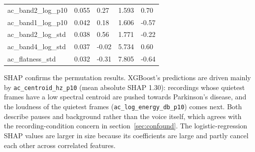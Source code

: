 \documentclass[11pt,a4paper]{article}
\begin{document}
\begin{center}
\begin{longtable}{>{\raggedright\arraybackslash}p{4.20cm}>{\raggedleft\arraybackslash}p{2.55cm}>{\raggedleft\arraybackslash}p{2.55cm}>{\raggedleft\arraybackslash}p{2.55cm}>{\raggedleft\arraybackslash}p{2.55cm}}
\hspace{0pt}ac\_\allowbreak{}band2\_\allowbreak{}log\_\allowbreak{}p10 & \hspace{0pt}0.055 & \hspace{0pt}0.27 & \hspace{0pt}1.593 & \hspace{0pt}0.70\\
\hspace{0pt}ac\_\allowbreak{}band1\_\allowbreak{}log\_\allowbreak{}p10 & \hspace{0pt}0.042 & \hspace{0pt}0.18 & \hspace{0pt}1.606 & \hspace{0pt}-0.57\\
\hspace{0pt}ac\_\allowbreak{}band2\_\allowbreak{}log\_\allowbreak{}std & \hspace{0pt}0.038 & \hspace{0pt}0.56 & \hspace{0pt}1.771 & \hspace{0pt}-0.22\\
\hspace{0pt}ac\_\allowbreak{}band4\_\allowbreak{}log\_\allowbreak{}std & \hspace{0pt}0.037 & \hspace{0pt}-0.02 & \hspace{0pt}5.734 & \hspace{0pt}0.60\\
\hspace{0pt}ac\_\allowbreak{}flatness\_\allowbreak{}std & \hspace{0pt}0.032 & \hspace{0pt}-0.31 & \hspace{0pt}7.805 & \hspace{0pt}-0.64\\
\end{longtable}\end{center}
\begin{tcolorbox}[colback=blue!3,colframe=blue!50!black,boxrule=0.5pt,arc=2pt,left=5pt,right=5pt,top=3pt,bottom=3pt,title={\small\bfseries What this tells us}]\small SHAP confirms the permutation results. XGBoost's predictions are driven mainly by \texttt{ac\_\allowbreak{}centroid\_\allowbreak{}hz\_\allowbreak{}p10} (mean absolute SHAP 1.30): recordings whose quietest frames have a low spectral centroid are pushed towards Parkinson's disease, and the loudness of the quietest frames (\texttt{ac\_\allowbreak{}log\_\allowbreak{}energy\_\allowbreak{}db\_\allowbreak{}p10}) comes next. Both describe pauses and background rather than the voice itself, which agrees with the recording-condition concern in section~\ref{sec:confound}. The logistic-regression SHAP values are larger in size because its coefficients are large and partly cancel each other across correlated features.\end{tcolorbox}
\end{document}
